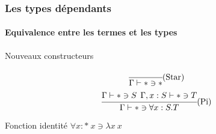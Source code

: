 \documentclass{beamer}
\newcommand{\Lam}[2]{\ensuremath{\lambda #1\: #2}}
\begin{document}
\begin{frame}
  \frametitle{Les types dépendants}
  \framesubtitle{Equivalence entre les termes et les types}

  \begin{block}{Nouveaux constructeurs}
    \[
    \begin{array}{cc}
    \cfrac{}
          {\Gamma \vdash * \ni *}\mbox{(Star)} 
          \medskip
          \\          
    \cfrac{\Gamma \vdash * \ni S\:\:\Gamma,x:S \vdash *\ni T}
          {\Gamma\vdash * \ni \forall x:S.T}\mbox{(Pi)}
    \end{array}
          \]
  \end{block}


  \begin{block}{Fonction identité}
    $\forall x:*\: x \ni \Lam{x}{x}$
  \end{block}
  


\end{frame}
\end{document}
